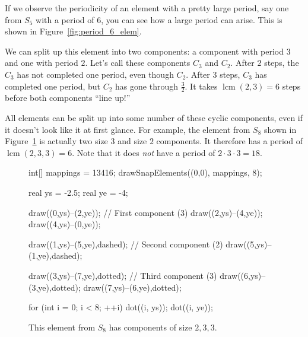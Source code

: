 \documentclass[../key.tex]{subfiles}
\begin{document}
If we observe the periodicity of an element with a pretty large period, say one from $S_5$ with a period of $6$, you can see how a large period can arise. This is shown in Figure~\ref{fig:period_6_elem}.

We can split up this element into two components: a component with period $3$ and one with period $2$. Let's call these components $C_3$ and $C_2$. After $2$ steps, the $C_3$ has not completed one period, even though $C_2$. After $3$ steps, $C_3$ has completed one period, but $C_2$ has gone through $\frac{3}{2}$. It takes $\operatorname{lcm}(2,3) = 6$ steps before both components ``line up!''

All elements can be split up into some number of these cyclic components, even if it doesn't look like it at first glance. For example, the element from $S_8$ shown in Figure~\ref{fig:period_8_elem} is actually two size $3$ and size $2$ components. It therefore has a period of $\operatorname{lcm}(2,3,3)=6$. Note that it does \textit{not} have a period of $2\cdot 3\cdot 3 = 18$.

\begin{figure}[h]
	\begin{center}
		\begin{minipage}[b]{\textwidth}
			\centering
			\begin{asy}[width=0.3\textwidth]
				int[] mappings = {13416};
				drawSnapElements((0,0), mappings, 8);

				real ys = -2.5;
				real ye = -4;

				draw((0,ys)--(2,ye)); // First component (3)
				draw((2,ys)--(4,ye));
				draw((4,ys)--(0,ye));

				draw((1,ys)--(5,ye),dashed); // Second component (2)
				draw((5,ys)--(1,ye),dashed);

				draw((3,ys)--(7,ye),dotted); // Third component (3)
				draw((6,ys)--(3,ye),dotted);
				draw((7,ys)--(6,ye),dotted);

				for (int i = 0; i < 8; ++i) {
					dot((i, ys));
					dot((i, ye));
				}
			\end{asy}
		\end{minipage}
	\end{center}
	\vspace*{-2\baselineskip}
	\begin{center}
		\begin{minipage}[t]{\textwidth}
			\caption{This element from $S_8$ has components of size $2,3,3$.}
			\label{fig:period_8_elem}
		\end{minipage}
	\end{center}
	\vspace*{-2\baselineskip}
\end{figure}
\end{document}
